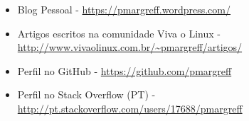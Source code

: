 \documentclass[11pt,a4paper,sans]{moderncv}        %
\begin{document}
\begin{itemize}

\item{Blog Pessoal - \href{https://pmargreff.wordpress.com/}{https://pmargreff.wordpress.com/}}

\item{Artigos escritos na comunidade Viva o Linux  - \href{http://www.vivaolinux.com.br/~pmargreff/artigos/}{http://www.vivaolinux.com.br/\~{}pmargreff/artigos/}}

\item{Perfil no GitHub - \href{https://github.com/pmargreff}{https://github.com/pmargreff}}

\item{Perfil no Stack Overflow (PT) - \href{http://pt.stackoverflow.com/users/17688/pmargreff}{http://pt.stackoverflow.com/users/17688/pmargreff}}

\end{itemize}


\nocite{*}



\end{document}
